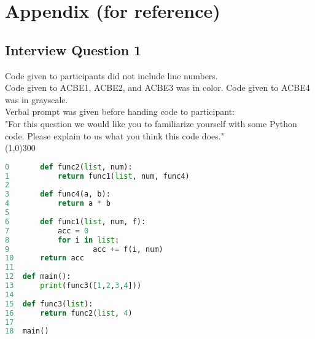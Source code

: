\documentclass{article}
\begin{document}
\section{Appendix (for reference)}
\subsection{Interview Question 1} 
Code given to participants did not include line numbers. \\
Code given to ACBE1, ACBE2, and ACBE3 was in color. Code given to ACBE4 was in grayscale. \\
Verbal prompt was given before handing code to participant: \\
"For this question we would like you to familiarize yourself with some Python code. Please explain to us what you think this code does." \\
\line(1,0){300}
\begin{lstlisting}[language=python]
0		def func2(list, num):
1			return func1(list, num, func4)
2
3		def func4(a, b):
4			return a * b
5
6		def func1(list, num, f):
7			acc = 0
8			for i in list:
9					acc += f(i, num)
10		return acc
11
12	def main():
13		print(func3([1,2,3,4]))
14
15	def func3(list):
16		return func2(list, 4)
17
18	main()

\end{lstlisting}
\newpage
\end{document}
